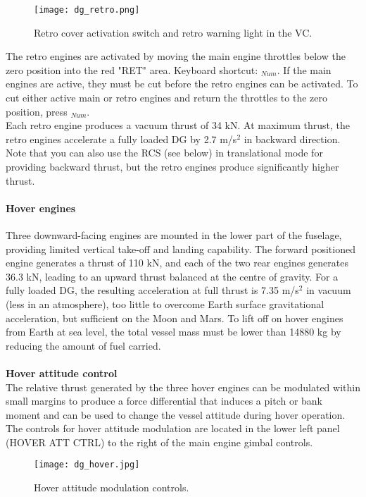 \documentclass[Orbiter User Manual.tex]{subfiles}
\begin{document}
\begin{figure}[H]
  \centering
  \texttt{[image: dg\_retro.png]}
  \caption{Retro cover activation switch and retro warning light in the VC.}
\end{figure}

\noindent
The retro engines are activated by moving the main engine throttles below the zero position into the red "RET" area. Keyboard shortcut: \Ctrl\keystroke{-}$_{Num}$. If the main engines are active, they must be cut before the retro engines can be activated. To cut either active main or retro engines and return the throttles to the zero position, press \keystroke{*}$_{Num}$.\\
Each retro engine produces a vacuum thrust of 34 kN. At maximum thrust, the retro engines accelerate a fully loaded DG by 2.7 m/s$^{2}$ in backward direction. Note that you can also use the RCS (see below) in translational mode for providing backward thrust, but the retro engines produce significantly higher thrust.

\paragraph{Hover engines}
Three downward-facing engines are mounted in the lower part of the fuselage, providing limited vertical take-off and landing capability. The forward positioned engine generates a thrust of 110 kN, and each of the two rear engines generates 36.3 kN, leading to an upward thrust balanced at the centre of gravity. For a fully loaded DG, the resulting acceleration at full thrust is 7.35 m/s$^{2}$ in vacuum (less in an atmosphere), too little to overcome Earth surface gravitational acceleration, but sufficient on the Moon and Mars. To lift off on hover engines from Earth at sea level, the total vessel mass must be lower than 14880 kg by reducing the amount of fuel carried.\\
\\
\textbf{Hover attitude control}\\
The relative thrust generated by the three hover engines can be modulated within small margins to produce a force differential that induces a pitch or bank moment and can be used to change the vessel attitude during hover operation. The controls for hover attitude modulation are located in the lower left panel (HOVER ATT CTRL) to the right of the main engine gimbal controls.

\begin{figure}[H]
  \centering
  \texttt{[image: dg\_hover.jpg]}
  \caption{Hover attitude modulation controls.}
\end{figure}
\end{document}

